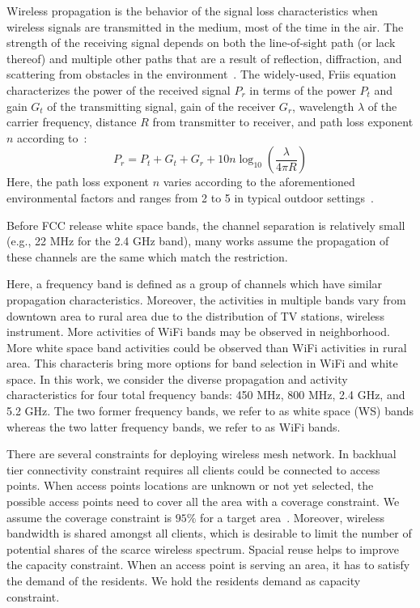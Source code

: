 Wireless propagation is the behavior of the signal loss characteristics 
when wireless signals are transmitted in the medium, most of the time in the air.
The strength of the receiving signal depends on both the line-of-sight
path (or lack thereof) and multiple other paths that are a result of 
reflection, diffraction, and scattering from obstacles in the 
environment~\cite{andersen1995propagation}. The widely-used, Friis
equation characterizes the power of the received signal $P_r$ in terms 
of the power $P_t$ and gain $G_t$ of the transmitting signal, gain of 
the receiver $G_r$, wavelength $\lambda$ of the carrier frequency, 
distance $R$ from transmitter to receiver, and path loss exponent $n$ according 
to~\cite{friis}:
\begin{equation}
\label{eq:friis}
P_r=P_t+G_t+G_r+10n \log_{10}\left( \frac{\lambda}{4\pi R}\right)
\end{equation}
Here, the path loss exponent $n$ varies according to the
aforementioned environmental factors and ranges from 2 to 5 in typical
outdoor settings~\cite{rappaport}.

Before FCC release white space bands, the channel separation is relatively 
small (e.g., 22 MHz for the 2.4 GHz band), many works assume the propagation 
of these channels are the same which match the restriction. 

Here, a frequency band is defined as a group of channels which have
similar propagation characteristics.
Moreover, the activities in multiple bands vary from downtown area 
to rural area due to the distribution of TV stations, wireless instrument. More 
activities of WiFi bands may be observed in neighborhood. More white space band
 activities could be observed than WiFi activities in rural area. 
This characteris bring more options for band selection in WiFi and white space.
In this work, we consider the diverse propagation and activity characteristics
for four total frequency bands: 450 MHz, 800 MHz, 2.4 GHz, and 5.2 GHz.
The two former frequency bands, we refer to as white space (WS) bands whereas
the two latter frequency bands, we refer to as WiFi bands.


There are several constraints for deploying wireless mesh network. In backhual tier 
connectivity constraint requires all clients could be connected to access points.
When access points locations are unknown or not yet selected, the possible access points
 need to cover all the area with a coverage constraint. We assume the coverage
constraint is $95\%$ for a target area~\cite{robinson2010deploying}. 
Moreover, wireless bandwidth is shared amongst all clients, which is desirable to 
limit the number of potential shares of the scarce wireless spectrum. Spacial reuse 
helps to improve the capacity constraint. When an access point is serving an area, it has
to satisfy the demand of the residents. We hold the residents demand as capacity constraint.

